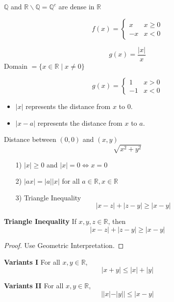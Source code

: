 \begin{prop}
\(\mathbb{Q}\) and \(\mathbb{R}\backslash \mathbb{Q}=\mathbb{Q}^c\) are dense in \(\mathbb{R}\)
\end{prop}

\begin{defn}
\begin{equation*}
f(x)=\begin{cases}
	x & x\geq 0\\
    -x & x<0
\end{cases}
\end{equation*}
\end{defn}

\begin{exmp}
\[g(x) = \frac{|x|}{x}\]
Domain \(= \{x\in \mathbb{R} \mid x\neq 0\}\)

\begin{equation*}
g(x) = \begin{cases}
	1 & x> 0 \\
    -1 & x<0
\end{cases}
\end{equation*}
\end{exmp}

\begin{itemize}
\item \(|x|\) represents the distance from \(x\) to 0.
\item \(|x-a|\) represents the distance from \(x\) to \(a\).
\end{itemize}

\begin{note}
Distance between \((0,0)\) and \((x,y)\)
\[\sqrt{x^2+y^2}\]
\end{note}
 
\begin{enumerate}
\item[1)] \(|x|\geq 0\) and \(|x| = 0 \iff x=0\)
\item[2)] \(|ax|=|a||x|\) for all \(a\in \mathbb{R}, x\in \mathbb{R}\)
\item[3)] Triangle Inequality
	\[|x-z|+|z-y|\geq |x-y|\]
\end{enumerate}


\begin{thm}
\textbf{Triangle Inequality} If \(x,y,z\in \mathbb{R}\), then	\[|x-z|+|z-y|\geq |x-y|\]
\end{thm}

\begin{proof}
Use Geometric Interpretation. %
\end{proof}

\begin{thm}\textbf{Variants I}
For all \(x,y\in \mathbb{R}\),
\[|x+y|\leq |x|+|y|\]
\end{thm}

\begin{thm}\textbf{Variants II}
For all \(x,y\in \mathbb{R}\),
\[||x|-|y||\leq |x-y|\]
\end{thm}












